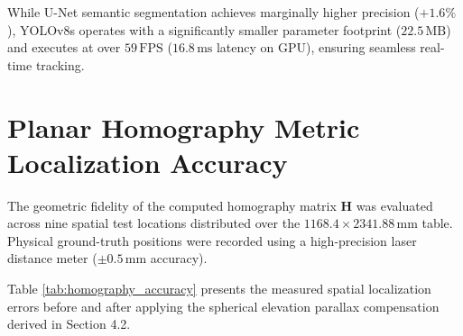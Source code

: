 \begin{table}[H]
\centering
\caption{Comparison of Detection Models on Snooker Table Dataset}
\label{tab:model_comparison}
\end{table}

While U-Net semantic segmentation achieves marginally higher precision ($+1.6\%$), YOLOv8s operates with a significantly smaller parameter footprint ($22.5\,\text{MB}$) and executes at over $59\,\text{FPS}$ ($16.8\,\text{ms}$ latency on GPU), ensuring seamless real-time tracking.

\section{Planar Homography Metric Localization Accuracy}
The geometric fidelity of the computed homography matrix $\mathbf{H}$ was evaluated across nine spatial test locations distributed over the $1168.4 \times 2341.88\,\text{mm}$ table. Physical ground-truth positions were recorded using a high-precision laser distance meter ($\pm 0.5\,\text{mm}$ accuracy).

Table \ref{tab:homography_accuracy} presents the measured spatial localization errors before and after applying the spherical elevation parallax compensation derived in Section 4.2.

